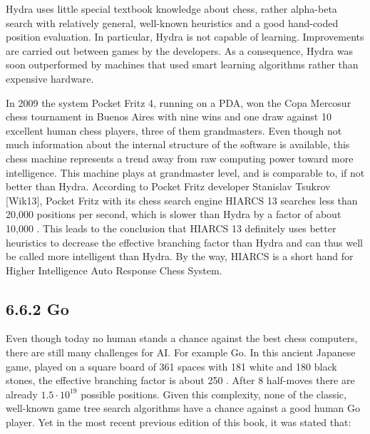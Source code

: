 \documentclass[10pt]{book}
\begin{document}
\begin{center}
\begin{enumerate}
Hydra uses little special textbook knowledge about chess, rather alpha-beta search with relatively general, well-known heuristics and a good hand-coded\\
position evaluation. In particular, Hydra is not capable of learning. Improvements are carried out between games by the developers. As a consequence, Hydra was soon outperformed by machines that used smart learning algorithms rather than expensive hardware.


In 2009 the system Pocket Fritz 4, running on a PDA, won the Copa Mercosur chess tournament in Buenos Aires with nine wins and one draw against 10 excellent human chess players, three of them grandmasters. Even though not much information about the internal structure of the software is available, this chess machine represents a trend away from raw computing power toward more intelligence. This machine plays at grandmaster level, and is comparable to, if not better than Hydra. According to Pocket Fritz developer Stanislav Tsukrov [Wik13], Pocket Fritz with its chess search engine HIARCS 13 searches less than 20,000 positions per second, which is slower than Hydra by a factor of about 10,000 . This leads to the conclusion that HIARCS 13 definitely uses better heuristics to decrease the effective branching factor than Hydra and can thus well be called more intelligent than Hydra. By the way, HIARCS is a short hand for Higher Intelligence Auto Response Chess System.

\subsection*{6.6.2 Go}
Even though today no human stands a chance against the best chess computers, there are still many challenges for AI. For example Go. In this ancient Japanese game, played on a square board of 361 spaces with 181 white and 180 black stones, the effective branching factor is about 250 . After 8 half-moves there are already $1.5 \cdot 10^{19}$ possible positions. Given this complexity, none of the classic, well-known game tree search algorithms have a chance against a good human Go player. Yet in the most recent previous edition of this book, it was stated that:


\end{enumerate}
\end{center}
\end{document}
